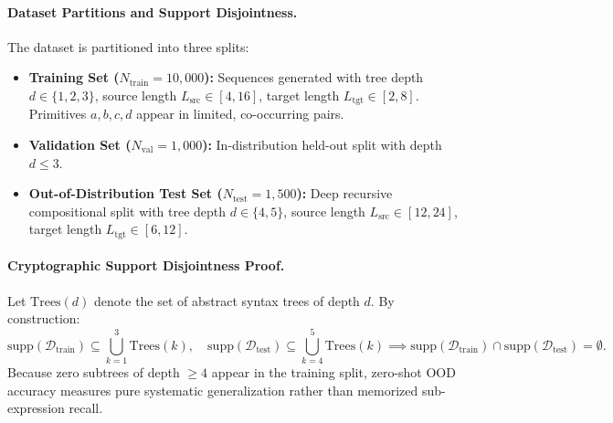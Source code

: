 \documentclass{article}
\theoremstyle{plain}
\theoremstyle{definition}
\begin{document}
\paragraph{Dataset Partitions and Support Disjointness.}
The dataset is partitioned into three splits:
\begin{itemize}[noitemsep]
    \item \textbf{Training Set ($N_{\text{train}} = 10{,}000$):} Sequences generated with tree depth $d \in \{1, 2, 3\}$, source length $L_{\text{src}} \in [4, 16]$, target length $L_{\text{tgt}} \in [2, 8]$. Primitives $a, b, c, d$ appear in limited, co-occurring pairs.
    \item \textbf{Validation Set ($N_{\text{val}} = 1{,}000$):} In-distribution held-out split with depth $d \le 3$.
    \item \textbf{Out-of-Distribution Test Set ($N_{\text{test}} = 1{,}500$):} Deep recursive compositional split with tree depth $d \in \{4, 5\}$, source length $L_{\text{src}} \in [12, 24]$, target length $L_{\text{tgt}} \in [6, 12]$.
\end{itemize}

\paragraph{Cryptographic Support Disjointness Proof.}
Let $\text{Trees}(d)$ denote the set of abstract syntax trees of depth $d$. By construction:
\begin{equation}
    \text{supp}(\mathcal{D}_{\text{train}}) \subseteq \bigcup_{k=1}^3 \text{Trees}(k), \quad \text{supp}(\mathcal{D}_{\text{test}}) \subseteq \bigcup_{k=4}^5 \text{Trees}(k) \implies \text{supp}(\mathcal{D}_{\text{train}}) \cap \text{supp}(\mathcal{D}_{\text{test}}) = \emptyset.
\end{equation}
Because zero subtrees of depth $\ge 4$ appear in the training split, zero-shot OOD accuracy measures pure systematic generalization rather than memorized sub-expression recall.
\end{document}
